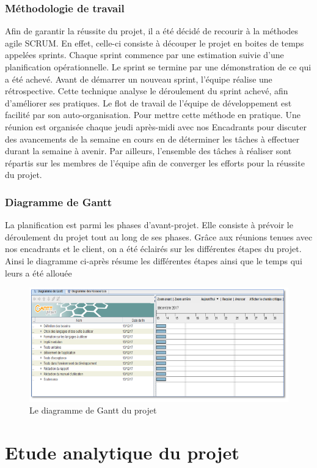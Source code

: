 \documentclass[12pt,a4paper]{report}
\begin{document}
	\subsection {Méthodologie de travail }
	Afin de garantir la réussite du projet, il a été décidé de recourir à la méthodes agile SCRUM. En effet, celle-ci consiste à découper le projet en boites de temps appelées sprints. Chaque sprint commence par une estimation suivie d'une planification opérationnelle. Le sprint se termine par une démonstration de ce qui a été achevé. Avant de démarrer un nouveau sprint, l'équipe réalise une rétrospective. Cette technique analyse le déroulement du sprint achevé, afin d'améliorer ses pratiques. Le flot de travail de l'équipe de développement est facilité par son auto-organisation. 
	Pour mettre cette méthode en pratique. Une réunion est organisée chaque jeudi après-midi avec nos Encadrants pour discuter des avancements de la semaine en cours en de déterminer les tâches à effectuer durant la semaine à avenir. Par ailleurs, l’ensemble des tâches à réaliser sont répartis sur les membres de l’équipe afin de converger les efforts pour la réussite du projet. 
	
	
	\subsection{Diagramme de Gantt  }
	La planification est parmi les phases d’avant-projet. Elle consiste à prévoir le déroulement du projet tout au long de ses phases. Grâce aux réunions tenues avec nos encadrants et le client, on a été éclairés sur les différentes étapes du projet.
	Ainsi le diagramme ci-après résume les différentes étapes ainsi que le temps qui leurs a été allouée
	\begin{figure}
	   \center
	   \includegraphics[scale=0.5]{Diagramme_Gantt.png}
	   \caption {Le diagramme de Gantt du projet}
	\end{figure}
	
	
	\chapter{Etude analytique du projet}
\end{document}
